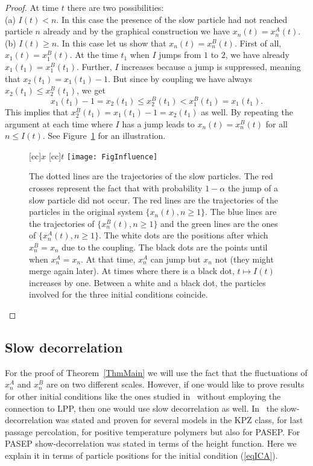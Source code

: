 \documentclass[12pt,a4paper]{article}
\numberwithin{equation}{section}
\begin{document}
\begin{proof}
At time $t$ there are two possibilities:\\
(a) $I(t)<n$. In this case the presence of the slow particle had not reached particle $n$ already and by the graphical construction we have $x_n(t)=x_n^A(t)$.\\
(b) $I(t)\geq n$. In this case let us show that $x_n(t)=x_n^B(t)$. First of all, $x_1(t)=x_1^B(t)$. At the time $t_1$ when $I$ jumps from $1$ to $2$, we have already $x_1(t_1)=x_1^B(t_1)$. Further, $I$ increases because a jump is suppressed, meaning that $x_2(t_1)=x_1(t_1)-1$. But since by coupling we have always $x_2(t_1)\leq x_2^B(t_1)$, we get
\begin{equation}
x_1(t_1)-1=x_2(t_1)\leq x_2^B(t_1)< x_1^B(t_1)=x_1(t_1).
\end{equation}
This implies that $x_2^B(t_1)=x_1(t_1)-1=x_2(t_1)$ as well. By repeating the argument at each time where $I$ has a jump leads to $x_n(t)=x_n^B(t)$ for all $n\leq I(t)$. See Figure~\ref{FigInfluence} for an illustration.
\begin{figure}[t!]
\begin{center}
[cc]{$x$}
[cc]{$t$}
\texttt{[image: FigInfluence]}
\caption{The dotted lines are the trajectories of the slow particles. The red crosses represent the fact that with probability $1-\alpha$ the jump of a slow particle did not occur. The red lines are the trajectories of the particles in the original system $\{x_n(t),n\geq 1\}$. The blue lines are the trajectories of $\{x_n^B(t),n\geq 1\}$ and the green lines are the ones of $\{x_n^A(t),n\geq 1\}$. The white dots are the positions after which $x_n^B=x_n$ due to the coupling. The black dots are the points until when $x_n^A=x_n$. At that time, $x_n^A$ can jump but $x_n$ not (they might merge again later). At times where there is a black dot, $t\mapsto I(t)$ increases by one. Between a white and a black dot, the particles involved for the three initial conditions coincide.}
\label{FigInfluence}
\end{center}
\end{figure}
\end{proof}

\subsection{Slow decorrelation}\label{SectSlowDec}
For the proof of Theorem~\ref{ThmMain} we will use the fact that the fluctuations of $x_n^A$ and $x_n^B$ are on two different scales. However, if one would like to prove results for other initial conditions like the ones studied in~\cite{FN13,FN16} without employing the connection to LPP, then one would use slow decorrelation as well. In~\cite{CFP10a} the slow-decorrelation was stated and proven for several models in the KPZ class, for last passage percolation, for positive temperature polymers but also for PASEP. For PASEP show-decorrelation was stated in terms of the height function. Here we explain it in terms of particle positions for the initial condition (\ref{eqICA}).
\end{document}
